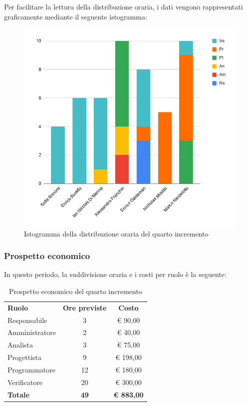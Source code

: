 \documentclass[../piano-di-progetto.tex]{subfiles}
\begin{document}
  Per facilitare la lettura della distribuzione oraria, i dati vengono rappresentati graficamente mediante il seguente istogramma:
  \begin{figure}[H]
    \centering
    \includegraphics[width=12cm]{img/ore-4-incr.png}
    \caption{Istogramma della distribuzione oraria del quarto incremento}
    \label{fig:ore-componente-progettazione}
  \end{figure}

  \subsubsection{Prospetto economico}
  In questo periodo, la suddivisione oraria e i costi per ruolo è la seguente:

  \begin{table}[H]
    \centering
    \begin{tabular}{lcc}
      \rowcolor{lightgray}
      \textbf{Ruolo}  & \textbf{Ore previste} & \textbf{Costo}    \\
Responsabile    & 3                     & € 90,00           \\
Amministratore  & 2                     & € 40,00           \\
Analista        & 3                     & € 75,00           \\
Progettista     & 9                     & € 198,00          \\
Programmatore   & 12                    & € 180,00          \\
Verificatore    & 20                    & € 300,00          \\
\textbf{Totale} & \textbf{49}           & \textbf{€ 883,00}
    \end{tabular}
    \caption{Prospetto economico del quarto incremento}
  \end{table}
\end{document}

